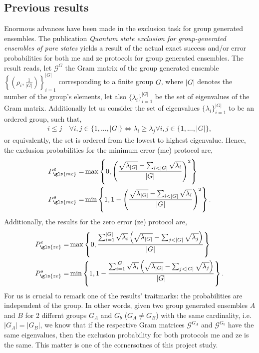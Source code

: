 \documentclass[12pt,letterpaper]{article}
\begin{document}
\begin{multicols}{2}
\subsection{Previous results}
Enormous advances have been made in the exclusion task for group generated ensembles. The publication \emph{Quantum state exclusion for group-generated ensembles of pure states}\cite{MainPaper} yields a result of the actual exact success and/or error probabilities for both \gls{me} and \gls{ze} protocols for group generated ensembles. The result reads, let $\mathcal{G}^{G}$ the Gram matrix of the group generated ensemble $\left\{\left(\rho_i,\frac{1}{|G|}\right)\right\}_{i=1}^{|G|}$ corresponding to a finite group $G$, where $|G|$ denotes the number of the group's elements, let also $\{\lambda_i\}_{i=1}^{|G|}$ be the set of eigenvalues of the Gram matrix. Additionally let us consider the set of eigenvalues $\{\lambda_i\}_{i=1}^{|G|}$ to be an ordered group, such that,
\begin{align*}
	i\leq j\quad\forall i,j\in\{1,...,|G|\}\Leftrightarrow \lambda_i\geq\lambda_j \forall i,j\in\{1,...,|G|\},
\end{align*}
or equivalently, the set is ordered from the lowest to highest eigenvalue. Hence, the exclusion probabilities for the minimum error (\gls{me}) protocol are,
\begin{align*}
	P_{\gls{me}}^e=&\max\left\{0,\left(\frac{\sqrt{\lambda_{|G|}}-\sum_{i<|G|}\sqrt{\lambda_i}}{|G|}\right)^2\right\}\\
	P_{\gls{me}}^s=&\min\left\{1,1-\left(\frac{\sqrt{\lambda_{|G|}}-\sum_{i<|G|}\sqrt{\lambda_i}}{|G|}\right)^2\right\}.
\end{align*}
Additionally, the results for the zero error (\gls{ze}) protocol are,
\begin{align*}
	P_{\gls{ze}}^e=&\max\left\{0,\frac{\sum_{i=1}^{|G|}\sqrt{\lambda_i}\left(\sqrt{\lambda_{|G|}}-\sum_{j<|G|}\sqrt{\lambda_j}\right)}{|G|}\right\}\\
	P_{\gls{ze}}^s=&\min\left\{1,1-\frac{\sum_{i=1}^{|G|}\sqrt{\lambda_i}\left(\sqrt{\lambda_{|G|}}-\sum_{j<|G|}\sqrt{\lambda_j}\right)}{|G|}\right\}.
\end{align*}
For us is crucial to remark one of the results' traitmarks: the probabilities are independent of the group. In other words, given two group generated ensembles $A$ and $B$ for 2 differnt groups $G_A$ and $G_b$ ($G_A\neq G_B$) with the same cardinality, i.e. $|G_A|=|G_B|$, we know that if the respective Gram matrices $\mathcal{G}^{G_A}$ and $\mathcal{G}^{G_b}$ have the same eigenvalues, then the exclusion probability for both protocols \gls{me} and \gls{ze} is the same. This matter is one of the cornersotnes of this project study.


\end{multicols}
\end{document}
